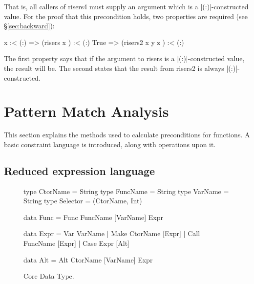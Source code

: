 \documentclass[preprint]{sigplanconf}
\newcommand{\C}[1]{\textsf{#1}}
\begin{document}
That is, all callers of \C{risers4} must supply an argument which is a |(:)|-constructed value. For the proof that this precondition holds, two properties are required (see \S\ref{sec:backward}):

\begin{code}
x :< (:)  => (risers x       ) :< (:)
True      => (risers2 x y z  ) :< (:)
\end{code}

\noindent The first property says that if the argument to \C{risers} is a |(:)|-constructed value, the result will be. The second states that the result from \C{risers2} is always |(:)|-constructed.

\section{Pattern Match Analysis}
\label{sec:manipulate}

This section explains the methods used to calculate preconditions for functions. A basic constraint language is introduced, along with operations upon it.

\subsection{Reduced expression language}
\label{sec:core}

\begin{figure}
\begin{code}
type CtorName  =  String
type FuncName  =  String
type VarName   =  String
type Selector  =  (CtorName, Int)

data Func  =  Func FuncName [VarName] Expr

data Expr  =  Var   VarName
           |  Make  CtorName  [Expr]
           |  Call  FuncName  [Expr]
           |  Case  Expr      [Alt]

data Alt   =  Alt CtorName [VarName] Expr
\end{code}
\caption{Core Data Type.}
\label{fig:core}
\end{figure}
\end{document}
